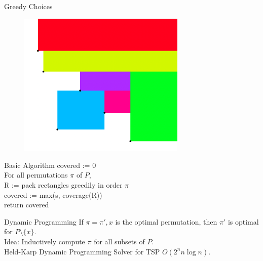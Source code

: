 \documentclass[11pt, british]{beamer}
\begin{document}
\begin{frame}{Greedy Choices}
  \begin{figure}
    \centering
    \includegraphics[width=8cm]{greedy-choice.png}
  \end{figure}
\end{frame}

\begin{frame}{Basic Algorithm}
  covered := 0 \\
  For all permutations $\pi$ of $P$, \\
  \phantom{RR} R := pack rectangles greedily in order $\pi$ \\
  \phantom{RR} covered := max(s, coverage(R)) \\
  return covered \\
\end{frame}

\begin{frame}{Dynamic Programming}
  If $\pi = \pi', x$ is the optimal permutation, then $\pi'$ is optimal for $P \setminus \{x\}$. \\

  Idea: Inductively compute $\pi$ for all subsets of $P$. \\

  Held-Karp Dynamic Programming Solver for TSP $O(2^n n\log n)$.
\end{frame}
\end{document}
